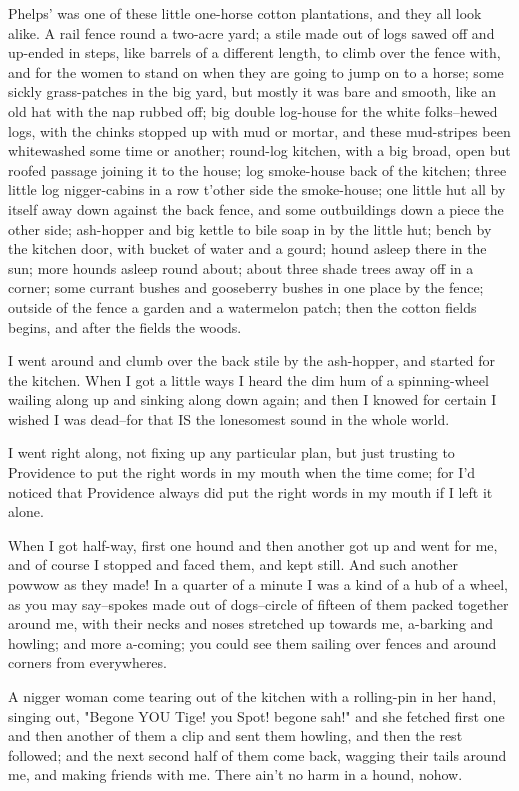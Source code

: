 Phelps' was one of these little one-horse cotton plantations, and they
all look alike.  A rail fence round a two-acre yard; a stile made out of
logs sawed off and up-ended in steps, like barrels of a different length,
to climb over the fence with, and for the women to stand on when they are
going to jump on to a horse; some sickly grass-patches in the big yard,
but mostly it was bare and smooth, like an old hat with the nap rubbed
off; big double log-house for the white folks--hewed logs, with the
chinks stopped up with mud or mortar, and these mud-stripes been
whitewashed some time or another; round-log kitchen, with a big broad,
open but roofed passage joining it to the house; log smoke-house back of
the kitchen; three little log nigger-cabins in a row t'other side the
smoke-house; one little hut all by itself away down against the back
fence, and some outbuildings down a piece the other side; ash-hopper and
big kettle to bile soap in by the little hut; bench by the kitchen door,
with bucket of water and a gourd; hound asleep there in the sun; more
hounds asleep round about; about three shade trees away off in a corner;
some currant bushes and gooseberry bushes in one place by the fence;
outside of the fence a garden and a watermelon patch; then the cotton
fields begins, and after the fields the woods.

I went around and clumb over the back stile by the ash-hopper, and
started for the kitchen.  When I got a little ways I heard the dim hum of
a spinning-wheel wailing along up and sinking along down again; and then
I knowed for certain I wished I was dead--for that IS the lonesomest
sound in the whole world.

I went right along, not fixing up any particular plan, but just trusting
to Providence to put the right words in my mouth when the time come; for
I'd noticed that Providence always did put the right words in my mouth if
I left it alone.

When I got half-way, first one hound and then another got up and went for
me, and of course I stopped and faced them, and kept still.  And such
another powwow as they made!  In a quarter of a minute I was a kind of a
hub of a wheel, as you may say--spokes made out of dogs--circle of
fifteen of them packed together around me, with their necks and noses
stretched up towards me, a-barking and howling; and more a-coming; you
could see them sailing over fences and around corners from everywheres.

A nigger woman come tearing out of the kitchen with a rolling-pin in her
hand, singing out, "Begone YOU Tige! you Spot! begone sah!" and she
fetched first one and then another of them a clip and sent them howling,
and then the rest followed; and the next second half of them come back,
wagging their tails around me, and making friends with me.  There ain't
no harm in a hound, nohow.


